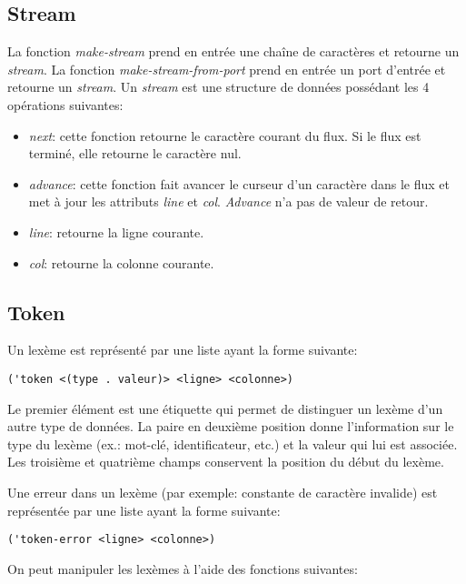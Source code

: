 \documentclass[11pt]{report}
\begin{document}
\subsection{Stream}

La fonction \emph{make-stream} prend en entrée une chaîne de
caractères et retourne un \emph{stream}.  La fonction
\emph{make-stream-from-port} prend en entrée un port d'entrée et
retourne un \emph{stream}.  Un \emph{stream} est une structure de
données possédant les 4 opérations suivantes:

\begin{itemize}
\item \emph{next}: cette fonction retourne le caractère courant du
  flux.  Si le flux est terminé, elle retourne le caractère nul.
\item \emph{advance}: cette fonction fait avancer le curseur d'un
  caractère dans le flux et met à jour les attributs \emph{line} et
  \emph{col}.  \emph{Advance} n'a pas de valeur de retour.
\item \emph{line}: retourne la ligne courante.
\item \emph{col}: retourne la colonne courante.
\end{itemize}


\subsection{Token}

Un lexème est représenté par une liste ayant la forme suivante:

\begin{verbatim}
('token <(type . valeur)> <ligne> <colonne>)
\end{verbatim}

Le premier élément est une étiquette qui permet de distinguer un
lexème d'un autre type de données.  La paire en deuxième position
donne l'information sur le type du lexème (ex.: mot-clé,
identificateur, etc.) et la valeur qui lui est associée.  Les
troisième et quatrième champs conservent la position du début du
lexème.

Une erreur dans un lexème (par exemple: constante de caractère
invalide) est représentée par une liste ayant la forme suivante:

\begin{verbatim}
('token-error <ligne> <colonne>)
\end{verbatim}


On peut manipuler les lexèmes à l'aide des fonctions suivantes:
\end{document}
